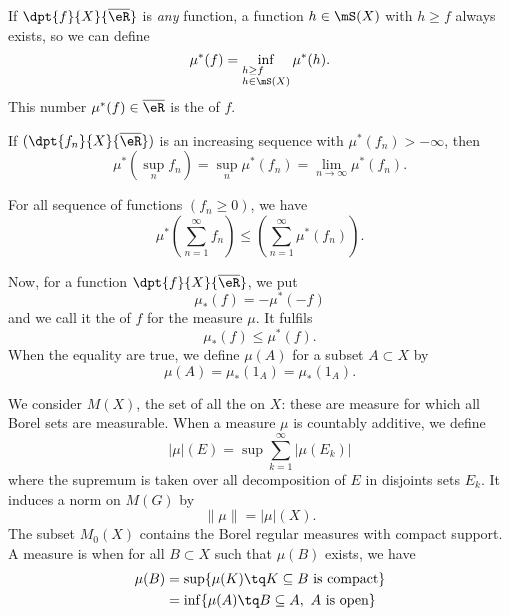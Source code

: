 If $\dpt{f}{X}{\overline{ \eR }}$ is \emph{any} function, a function $h\in\mS(X)$ with $h\geq f$ always exists, so we can define
\begin{equation}
  \mu^*(f)=\inf_{%
\begin{subarray}{l}
h\geq f\\
h\in\mS(X)
\end{subarray}
} \mu^*(h).
\end{equation}
This number $\mu^*(f)\in\overline{ \eR }$ is the  of $f$.


\begin{proposition}
If $(\dpt{f_n}{X}{\overline{ \eR }})$ is an increasing sequence with $\mu^*(f_n)>-\infty$, then
\[
  \mu^*(\sup_nf_n)=\sup_n\mu^*(f_n)=\lim_{n\to\infty}\mu^*(f_n).
\]

\end{proposition}

\begin{proposition}
For all sequence of functions $(f_n\geq 0)$, we have
\[
  \mu^*\left( \sum_{n=1}^{\infty}f_n\right)\leq\left(\sum_{n=1}^{\infty}\mu^*(f_n) \right).
\]

\end{proposition}

Now, for a function $\dpt{f}{X}{\overline{ \eR }}$, we put
\begin{equation}
  \mu_*(f)=-\mu^*(-f)
\end{equation}
and we call it the  of $f$ for the measure $\mu$. It fulfils
\[
  \mu_*(f)\leq\mu^*(f).
\]
When the equality are true, we define $\mu(A)$ for a subset $A\subset X$ by
\begin{equation}
   \mu(A)=\mu_*(1_A)=\mu_*(1_A).
\end{equation}

We consider $M(X)$\label{defMX}, the set of all the  on $X$: these are measure for which all Borel sets are measurable. When a measure $\mu$ is countably additive, we define
\begin{equation}
   | \mu |(E)=\sup \sum_{k=1}^{\infty}| \mu(E_k) |
\end{equation}
where the supremum is taken over all decomposition of $E$ in disjoints sets $E_k$. It induces a norm on $M(G)$ by
\[
  \| \mu \|=| \mu |(X).
\]
The subset  $M_0(X)$\label{defMzX} contains the Borel regular measures with compact support. A measure is  when for all $B\subset X$ such that $\mu(B)$ exists, we have
\begin{equation}
\begin{split}
    \mu(B)&=\sup\{ \mu(K)\tq K\subseteq B \textrm{ is compact} \}\\
		&=\inf\{ \mu(A)\tq B\subseteq A, \textrm{ $A$ is open} \}
\end{split}
\end{equation}


